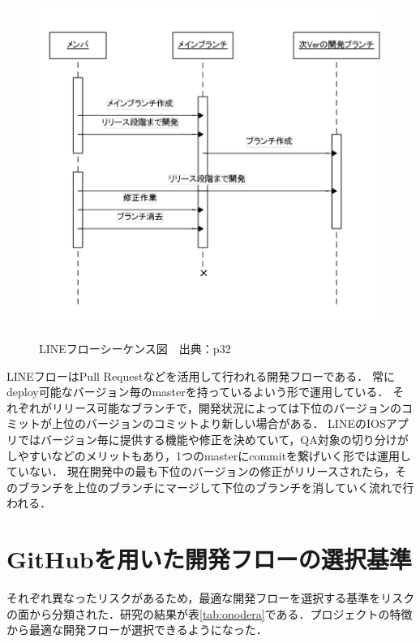 \begin{figure}[H]
\centering　
\includegraphics{linesi.png}
\caption{LINEフローシーケンス図　出典：\cite{onodera2015}p32}\label{tab:linesi}
\end{figure}


LINEフローはPull Requestなどを活用して行われる開発フローである．
常にdeploy可能なバージョン毎のmasterを持っているよいう形で運用している．
それぞれがリリース可能なブランチで，開発状況によっては下位のバージョンのコミットが上位のバージョンのコミットより新しい場合がある．
LINEのIOSアプリではバージョン毎に提供する機能や修正を決めていて，QA対象の切り分けがしやすいなどのメリットもあり，1つのmasterにcommitを繋げいく形では運用していない．
現在開発中の最も下位のバージョンの修正がリリースされたら，そのブランチを上位のブランチにマージして下位のブランチを消していく流れで行われる\cite{hayaishi2014}．


\section{GitHubを用いた開発フローの選択基準}
それぞれ異なったリスクがあるため，最適な開発フローを選択する基準をリスクの面から分類された．研究の結果が表\ref{tab:onodera}である．プロジェクトの特徴から最適な開発フローが選択できるようになった．

